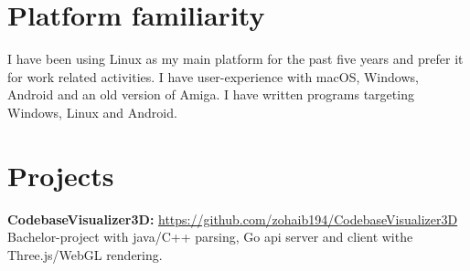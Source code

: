\documentclass{crudecv/crudecv}
\begin{document}
\section{Platform familiarity}
I have been using Linux as my main platform for the past five years and prefer it for work related activities. I have user-experience with macOS, Windows, Android and an old version of Amiga. I have written programs targeting Windows, Linux and Android.

\section{Projects}
\textbf{CodebaseVisualizer3D:} \hfill \href{https://github.com/zohaib194/CodebaseVisualizer3D}{https://github.com/zohaib194/CodebaseVisualizer3D} \\
Bachelor-project with java/C++ parsing, Go api server and client withe Three.js/WebGL rendering.
\end{document}
